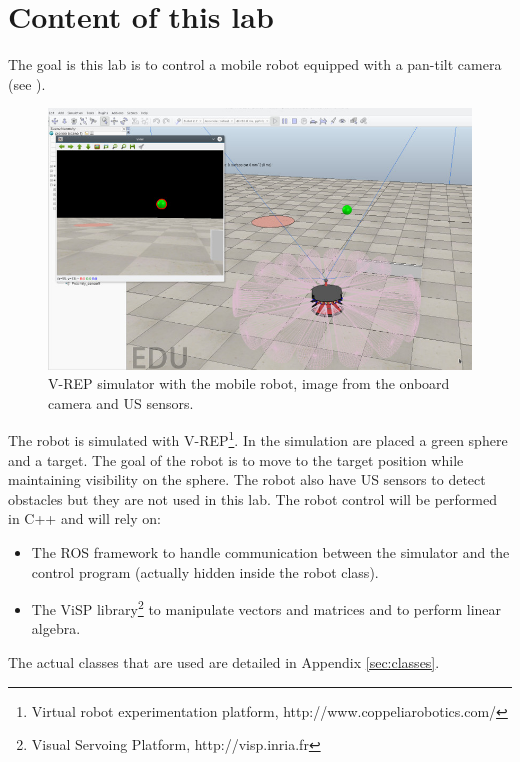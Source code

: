 \documentclass{ecnreport}
\begin{document}




\section{Content of this lab}

The goal is this lab is to control a mobile robot equipped with a pan-tilt camera 
 (see ).

\begin{figure}[h!]\centering
 \includegraphics[width=.8\linewidth]{vrep}
 \caption{V-REP simulator with the mobile robot, image from the onboard camera and US sensors.}
 \label{fig:vrep}
\end{figure}

The robot is simulated with V-REP\footnote{Virtual robot experimentation platform, http://www.coppeliarobotics.com/}.
In the simulation are placed a green sphere and a target. The goal of the robot is to move to the target position while maintaining visibility on the sphere. The robot also have US sensors
to detect obstacles but they are not used in this lab.
The robot control will be performed in C++ and will rely on:

\begin{itemize}
 \item The ROS framework to handle communication between the simulator and the control program (actually hidden inside the robot class).
 \item The ViSP library\footnote{Visual Servoing Platform, http://visp.inria.fr} to manipulate vectors and matrices and to perform linear algebra.
\end{itemize}
The actual classes that are used are detailed in Appendix \ref{sec:classes}.\\
\end{document}
